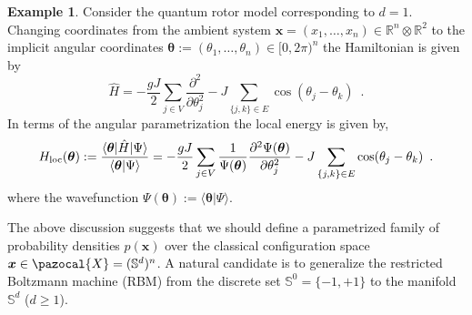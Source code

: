 \documentclass[12pt]{article}
\DeclareMathOperator*{\Hess}{Hess}
\theoremstyle{definition}%
\theoremstyle{definition}
\newtheorem{exmp}{Example}[section]
\theoremstyle{remark}
\begin{document}
\begin{exmp}
Consider the quantum rotor model corresponding to $d=1$. Changing coordinates from the ambient system $\bm{x} = (x_1,\ldots,x_n) \in \mathbb{R}^n \otimes \mathbb{R}^2$ to the implicit angular coordinates $\bm{\theta} := (\theta_1,\ldots,\theta_n) \in [0,2\pi)^n$ the Hamiltonian is given by
\begin{equation}
	\hat{H} = -\frac{gJ}{2} \sum_{j \in V} \frac{\partial^2}{\partial \theta_j^2} - J \sum_{\{ j , k \} \in E}  \cos(\theta_j - \theta_k) \enspace .
\end{equation}
In terms of the angular parametrization the local energy is given by,
\begin{equation}
	H_{\rm loc}(\bm{\theta}) := \frac{\langle \bm{\theta} | \hat{H} | \Psi \rangle}{\langle \bm{\theta} | \Psi \rangle} = -\frac{gJ}{2} \sum_{j \in V} \frac{1}{\Psi(\bm{\theta})}\frac{\partial^2\Psi(\bm{\theta})}{\partial \theta_j^2} - J \sum_{\{ j, k \} \in E}  \cos(\theta_j - \theta_k) \enspace .
\end{equation}
where the wavefunction $\Psi(\bm{\theta}) := \langle \bm{\theta} | \Psi \rangle$. 
\end{exmp}

The above discussion suggests that we should define a parametrized family of probability densities $p(\bm{x})$ over the classical configuration space $\bm{x}\in\pazocal{X} = (\mathbb{S}^d)^n$. A natural candidate is to generalize the restricted Boltzmann machine (RBM) from the discrete set $\mathbb{S}^0 = \{-1, +1 \}$ to the manifold $\mathbb{S}^d$ ($d \geq 1$).
\end{document}
